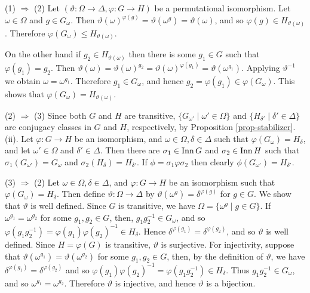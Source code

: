 \begin{sketch}
	(1) $\Rightarrow$ (2) Let $(\vartheta: \Omega  \to \Delta , \varphi: G  \to H)$ be a permutational isomorphism. Let $\omega \in \Omega $ and $g \in G_{\omega}$. Then $\vartheta(\omega) ^{\varphi (g)} = \vartheta(\omega^g) = \vartheta(\omega)$, and so $\varphi(g) \in H_{\vartheta(\omega)}$. Therefore $\varphi (G_{\omega}) \leq H_{\vartheta(\omega)}$. 
	
	On the other hand if $g_2 \in H_{\vartheta(\omega)}$ then there is some $g_1 \in G $ such that $\varphi(g_1) = g_2$. Then $\vartheta(\omega) = \vartheta(\omega)^{g_2} = \vartheta(\omega)^{\varphi(g_1)} = \vartheta(\omega^{g_1})$. Applying $\vartheta^{-1}$ we obtain $\omega = \omega^{g_1}$. Therefore $g_1 \in G_{\omega}$, and hence $g_2 = \varphi(g_1) \in \varphi(G_{\omega})$. This shows that $\varphi(G_{\omega} ) = H_{\vartheta(\omega)}$.
	
	(2) $\Rightarrow$ (3) Since both $G$ and $H$ are transitive, $\{G_{\omega'} \mid \omega' \in \Omega \}$ and $\{H_{\delta'} \mid \delta' \in \Delta \}$ are conjugacy classes in $G$ and $H$, respectively, by Proposition \ref{prop-stabilizer}.(ii). Let $\varphi: G  \to H$ be an isomorphism, and $\omega \in \Omega , \delta \in \Delta$ such that $\varphi(G_{\omega}) = H_{\delta}$, and let $\omega' \in \Omega $ and $\delta' \in \Delta $. Then there are $\sigma_1 \in \operatorname{Inn} G$ and $\sigma_2 \in \operatorname{Inn} H$ such that $\sigma_1(G_{\omega'}) = G_{\omega}$ and $\sigma_2(H_{\delta}) = H_{\delta'}$. If $\phi = \sigma_1\varphi\sigma_2$ then clearly $\phi(G_{\omega'} ) = H_{\delta'}$.
	
	(3) $\Rightarrow$ (2) Let $\omega \in \Omega , \delta \in \Delta $, and $\varphi: G  \to H$ be an isomorphism such that $\varphi(G_{\omega} ) = H_{\delta}$. Then define $\vartheta: \Omega  \to \Delta $ by $\vartheta (\omega^g)= \delta^{\varphi(g)}$ for $g \in G $. We show that $\vartheta$ is well defined. Since $G $ is transitive, we have $\Omega = \{\omega^g\mid g\in G\}$. If $\omega^{g_1} = \omega^{g_2}$ for some $g_1, g_2 \in G $, then, $g_1g_2^{-1} \in G_{\omega}$, and so $\varphi(g_1g_2^{-1}) = \varphi(g_1)\varphi(g_2)^{-1} \in H_{\delta}$. Hence $\delta^{\varphi(g_1)} = \delta^{\varphi(g_2)}$, and so $\vartheta$ is well defined.  Since $H = \varphi(G)$ is transitive, $\vartheta$ is surjective. For injectivity, suppose that $\vartheta(\omega^{g_1} ) = \vartheta(\omega^{g_2} )$ for some $g_1, g_2 \in G$, then, by the definition of $\vartheta$, we have $\delta^{\varphi(g_1)} = \delta^{\varphi(g_2)}$ and so $\varphi(g_1)\varphi(g_2)^{-1} = \varphi(g_1g_2^{-1}) \in H_{\delta}$. Thus $g_1g_2^{-1} \in G_{\omega}$, and so $\omega^{g_1} = \omega^{g_2}$. Therefore $\vartheta$ is injective, and hence $\vartheta$ is a bijection. 
	

\end{sketch}
